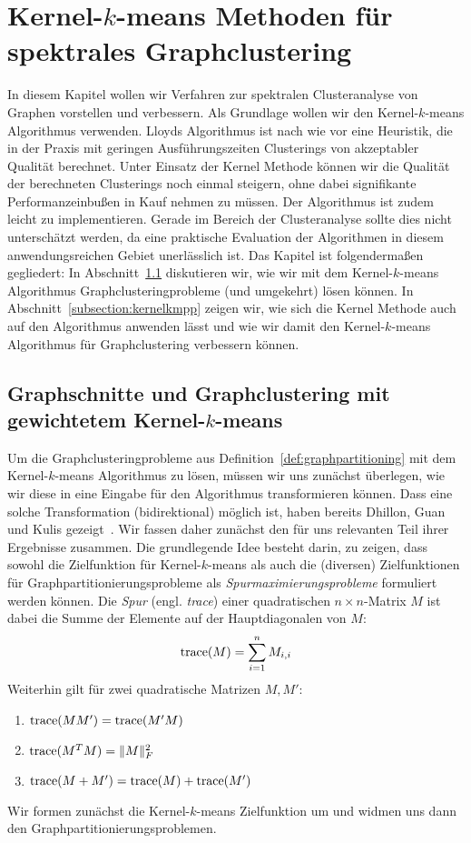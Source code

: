 \section{Kernel-\texorpdfstring{$k$}{k}-means Methoden für spektrales Graphclustering}
\label{section:main}

In diesem Kapitel wollen wir Verfahren zur spektralen Clusteranalyse von Graphen vorstellen und verbessern. Als Grundlage wollen
wir den Kernel-$k$-means Algorithmus verwenden. Lloyds Algorithmus ist nach wie vor eine Heuristik, die in der Praxis mit geringen
Ausführungszeiten Clusterings von akzeptabler Qualität berechnet. Unter Einsatz der Kernel Methode können wir die
Qualität der berechneten Clusterings noch einmal steigern, ohne dabei signifikante Performanzeinbußen in Kauf nehmen zu müssen.
Der Algorithmus ist zudem leicht zu implementieren. Gerade im Bereich der Clusteranalyse sollte dies nicht unterschätzt werden,
da eine praktische Evaluation der Algorithmen in diesem anwendungsreichen Gebiet unerlässlich ist.
\absatz
Das Kapitel ist folgendermaßen gegliedert: In Abschnitt~\ref{subsection:wkkm-graphcut-graphclustering} diskutieren wir, wie wir
mit dem Kernel-$k$-means Algorithmus Graphclusteringprobleme (und umgekehrt) lösen können. In Abschnitt~\ref{subsection:kernelkmpp}
zeigen wir, wie sich die Kernel Methode auch auf den Algorithmus \kmpp{} anwenden lässt und wie wir damit den
Kernel-$k$-means Algorithmus für Graphclustering verbessern können.

\subsection{Graphschnitte und Graphclustering mit gewichtetem Kernel-\texorpdfstring{$k$}{k}-means}
\label{subsection:wkkm-graphcut-graphclustering}

Um die Graphclusteringprobleme aus Definition~\ref{def:graphpartitioning} mit dem Kernel-$k$-means Algorithmus zu lösen,
müssen wir uns zunächst überlegen, wie wir diese in eine Eingabe für den Algorithmus transformieren können. Dass eine solche
Transformation (bidirektional) möglich ist, haben bereits Dhillon, Guan und Kulis gezeigt~\cite{DhillonGK04,DhillonGK07}. Wir
fassen daher zunächst den für uns relevanten Teil ihrer Ergebnisse zusammen.
\absatz
Die grundlegende Idee besteht darin, zu zeigen, dass sowohl die Zielfunktion für Kernel-$k$-means als auch die (diversen)
Zielfunktionen für Graphpartitionierungsprobleme als \emph{Spurmaximierungsprobleme} formuliert werden können. Die
\emph{Spur} (engl. \emph{trace}) einer quadratischen $n \times n$-Matrix $M$ ist dabei die Summe der Elemente auf der
Hauptdiagonalen von $M$:
\[ \operatorname*{trace}(M) = \sum_{i=1}^{n} M_{i,i} \]
Weiterhin gilt für zwei quadratische Matrizen $M,M'$:
\begin{enumerate}
	\item 	$\operatorname*{trace}(MM') = \operatorname*{trace}(M'M)$
	\item 	$\operatorname*{trace}(M^TM) = \lVert{M}\rVert_F^2$
	\item 	$\operatorname*{trace}(M+M') = \operatorname*{trace}(M) + \operatorname*{trace}(M')$
\end{enumerate}
Wir formen zunächst die Kernel-$k$-means Zielfunktion um und widmen uns dann den Graphpartitionierungsproblemen.

